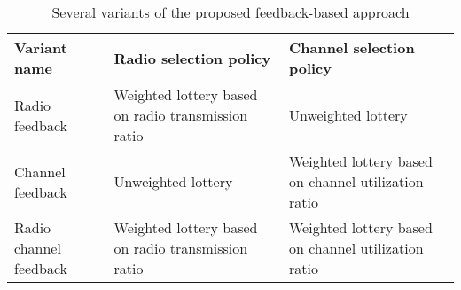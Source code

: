 \begin{table*}
\begin{center}
  \caption{Several variants of the proposed feedback-based approach}
  \label{tab:variantDefintion}
  \begin{tabular}{p{}p{}p{}}
    \toprule
    Variant name & Radio selection policy & Channel selection policy\\
    \midrule
    Radio feedback & Weighted lottery based on radio transmission ratio & Unweighted lottery \\
    Channel feedback & Unweighted lottery  & Weighted lottery based on channel utilization ratio \\
    Radio channel feedback & Weighted lottery based on radio transmission ratio & Weighted lottery based on channel utilization ratio \\
    \bottomrule
  \end{tabular}
\end{center}
\vspace{-0.8cm}
\end{table*}
\endinput
